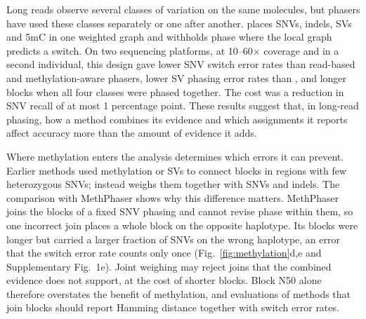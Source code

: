 
Long reads observe several classes of variation on the same molecules, but phasers have used these classes separately or one after another. \toolname places SNVs, indels, SVs and 5mC in one weighted graph and withholds phase where the local graph predicts a switch. On two sequencing platforms, at 10--60$\times$ coverage and in a second individual, this design gave lower SNV switch error rates than read-based and methylation-aware phasers, lower SV phasing error rates than \whatshap, and longer blocks when all four classes were phased together. The cost was a reduction in SNV recall of at most 1 percentage point. These results suggest that, in long-read phasing, how a method combines its evidence and which assignments it reports affect accuracy more than the amount of evidence it adds.

Where methylation enters the analysis determines which errors it can prevent. Earlier methods used methylation or SVs to connect blocks in regions with few heterozygous SNVs\cite{akbari2021nanomethphase,fu2024methphaser,akbari2023parentoforigin,lin2022longphase,holt2024hiphase}; \toolname instead weighs them together with SNVs and indels. The comparison with MethPhaser shows why this difference matters. MethPhaser joins the blocks of a fixed SNV phasing and cannot revise phase within them, so one incorrect join places a whole block on the opposite haplotype. Its blocks were longer but carried a larger fraction of SNVs on the wrong haplotype, an error that the switch error rate counts only once (Fig.~\ref{fig:methylation}d,e and Supplementary Fig.~1e). Joint weighing may reject joins that the combined evidence does not support, at the cost of shorter blocks. Block N50 alone therefore overstates the benefit of methylation, and evaluations of methods that join blocks should report Hamming distance together with switch error rates.

